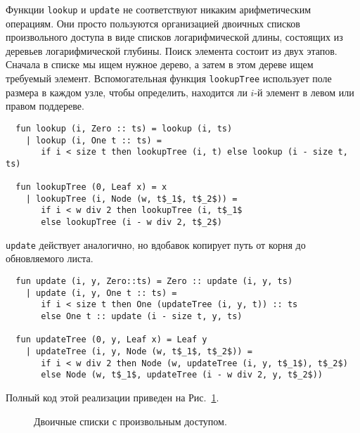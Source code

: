 \begin{frame}[fragile]{}
Функции \lstinline!lookup! и \lstinline!update! не соответствуют
никаким арифметическим операциям. Они просто пользуются организацией
двоичных списков произвольного доступа в виде списков логарифмической
длины, состоящих из деревьев логарифмической глубины. Поиск элемента
состоит из двух этапов. Сначала в списке мы ищем нужное дерево, а
затем в этом дереве ищем требуемый элемент. Вспомогательная функция
\lstinline!lookupTree! использует поле размера в каждом узле, чтобы
определить, находится ли $i$-й элемент в левом или правом
поддереве.
\begin{lstlisting}
  fun lookup (i, Zero :: ts) = lookup (i, ts)
    | lookup (i, One t :: ts) =
       if i < size t then lookupTree (i, t) else lookup (i - size t, ts)

  fun lookupTree (0, Leaf x) = x
    | lookupTree (i, Node (w, t$_1$, t$_2$)) =
       if i < w div 2 then lookupTree (i, t$_1$
       else lookupTree (i - w div 2, t$_2$)
\end{lstlisting}
\lstinline!update! действует аналогично, но вдобавок копирует путь от
корня до обновляемого листа.
\begin{lstlisting}
  fun update (i, y, Zero::ts) = Zero :: update (i, y, ts)
    | update (i, y, One t :: ts) =
       if i < size t then One (updateTree (i, y, t)) :: ts
       else One t :: update (i - size t, y, ts)

  fun updateTree (0, y, Leaf x) = Leaf y
    | updateTree (i, y, Node (w, t$_1$, t$_2$)) =
       if i < w div 2 then Node (w, updateTree (i, y, t$_1$), t$_2$)
       else Node (w, t$_1$, updateTree (i - w div 2, y, t$_2$))
\end{lstlisting}
Полный код этой реализации приведен на Рис.~\ref{fig:9.6}.

\begin{figure}
  \centering

  \caption{Двоичные списки с произвольным доступом.}
  \label{fig:9.6}
\end{figure}
\end{frame}

